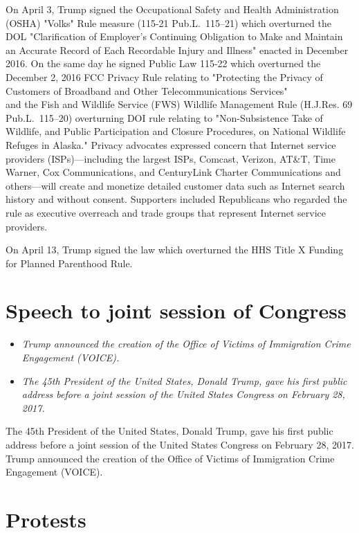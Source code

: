 On April 3, Trump signed the Occupational Safety and Health
Administration (OSHA) "Volks" Rule measure (115-21 Pub.L.~115--21) which
overturned the DOL "Clarification of Employer's Continuing Obligation to
Make and Maintain an Accurate Record of Each Recordable Injury and
Illness" enacted in December 2016. On the same day he signed Public Law
115-22 which overturned the December 2, 2016 FCC Privacy Rule relating
to "Protecting the Privacy of Customers of Broadband and Other
Telecommunications Services"\\
and the Fish and Wildlife Service (FWS) Wildlife Management Rule
(H.J.Res. 69 Pub.L.~115--20) overturning DOI rule relating to
"Non-Subsistence Take of Wildlife, and Public Participation and Closure
Procedures, on National Wildlife Refuges in Alaska." Privacy advocates
expressed concern that Internet service providers (ISPs)---including the
largest ISPs, Comcast, Verizon, AT\&T, Time Warner, Cox Communications,
and CenturyLink Charter Communications and others---will create and
monetize detailed customer data such as Internet search history and
without consent. Supporters included Republicans who regarded the rule
as executive overreach and trade groups that represent Internet service
providers.

On April 13, Trump signed the law which overturned the HHS Title X
Funding for Planned Parenthood Rule.

\section{Speech to joint session of
Congress}\label{speech-to-joint-session-of-congress}

\begin{itemize}
\item
  \emph{Trump announced the creation of the Office of Victims of
  Immigration Crime Engagement (VOICE).}
\item
  \emph{The 45th President of the United States, Donald Trump, gave his
  first public address before a joint session of the United States
  Congress on February 28, 2017.}
\end{itemize}

The 45th President of the United States, Donald Trump, gave his first
public address before a joint session of the United States Congress on
February 28, 2017. Trump announced the creation of the Office of Victims
of Immigration Crime Engagement (VOICE).

\section{Protests}\label{protests}

